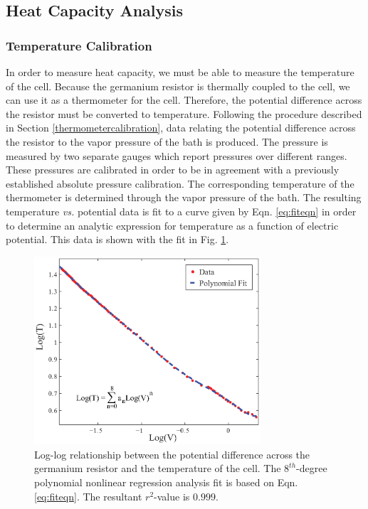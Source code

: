 \subsection{Heat Capacity Analysis}\label{heatcapacityanalysis}
\subsubsection{Temperature Calibration}\label{temperaturecalibration}

In order to measure heat capacity, we must be able to measure the temperature of the cell.  Because the germanium resistor is thermally coupled to the cell, we can use it as a thermometer for the cell.  Therefore, the potential difference across the resistor must be converted to temperature.  Following the procedure described in Section \ref{thermometercalibration}, data relating the potential difference across the resistor to the vapor pressure of the bath is produced.  The pressure is measured by two separate gauges which report pressures over different ranges. These pressures are calibrated in order to be in agreement with a previously established absolute pressure calibration.  The corresponding temperature of the thermometer is determined through the vapor pressure of the bath. The resulting temperature \emph{vs.} potential data is fit to a curve given by Eqn. \ref{eq:fiteqn} in order to determine an analytic expression for temperature as a function of electric potential. This data is shown with the fit in Fig. \ref{fig:polyfit}.  
\begin{figure}[htbp]
\begin{center}
\includegraphics[height=70mm]{./figures/polyfit.eps}
\caption{\small{Log-log relationship between the potential difference across the germanium resistor and the temperature of the cell.  The $8^{th}$-degree polynomial nonlinear regression analysis fit is based on Eqn. \ref{eq:fiteqn}. The resultant $r^{2}$-value is $0.999$.}}
\label{fig:polyfit}
\end{center}
\end{figure}

